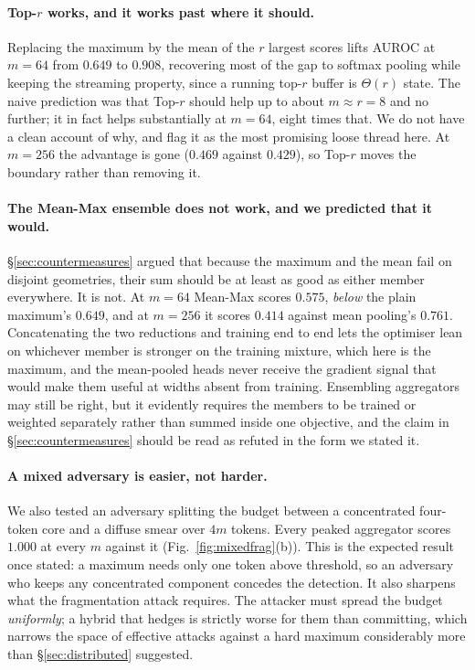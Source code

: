 \documentclass[10pt]{article}
\theoremstyle{plain}
\theoremstyle{definition}
\theoremstyle{remark}
\begin{document}
\paragraph{Top-$r$ works, and it works past where it should.} Replacing the maximum by the
mean of the $r$ largest scores lifts AUROC at $m{=}64$ from $0.649$ to $0.908$, recovering
most of the gap to softmax pooling while keeping the streaming property, since a running
top-$r$ buffer is $\Theta(r)$ state. The naive prediction was that Top-$r$ should help up
to about $m\approx r=8$ and no further; it in fact helps substantially at $m{=}64$, eight
times that. We do not have a clean account of why, and flag it as the most promising
loose thread here. At $m{=}256$ the advantage is gone ($0.469$ against $0.429$), so
Top-$r$ moves the boundary rather than removing it.

\paragraph{The Mean-Max ensemble does not work, and we predicted that it would.}
\S\ref{sec:countermeasures} argued that because the maximum and the mean fail on disjoint
geometries, their sum should be at least as good as either member everywhere. It is not.
At $m{=}64$ Mean-Max scores $0.575$, \emph{below} the plain maximum's $0.649$, and at
$m{=}256$ it scores $0.414$ against mean pooling's $0.761$. Concatenating the two
reductions and training end to end lets the optimiser lean on whichever member is stronger
on the training mixture, which here is the maximum, and the mean-pooled heads never
receive the gradient signal that would make them useful at widths absent from training.
Ensembling aggregators may still be right, but it evidently requires the members to be
trained or weighted separately rather than summed inside one objective, and the claim in
\S\ref{sec:countermeasures} should be read as refuted in the form we stated it.

\paragraph{A mixed adversary is easier, not harder.} We also tested an adversary splitting
the budget between a concentrated four-token core and a diffuse smear over $4m$ tokens.
Every peaked aggregator scores $1.000$ at every $m$ against it
(Fig.~\ref{fig:mixedfrag}(b)). This is the expected result once stated: a maximum needs
only one token above threshold, so an adversary who keeps any concentrated component
concedes the detection. It also sharpens what the fragmentation attack requires. The
attacker must spread the budget \emph{uniformly}; a hybrid that hedges is strictly worse
for them than committing, which narrows the space of effective attacks against a hard
maximum considerably more than \S\ref{sec:distributed} suggested.
\end{document}
